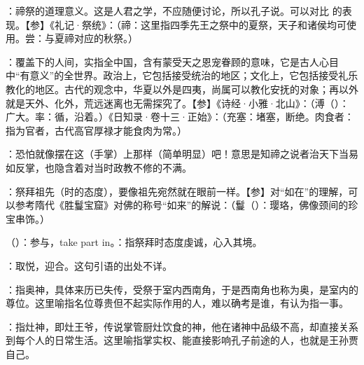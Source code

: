 {
\item {}：禘祭的道理意义。这是人君之学，不应随便讨论，所以孔子说。可以对比  的表现。【参】《礼记·祭统》：（禘：这里指四季先王之祭中的夏祭，天子和诸侯均可使用。尝：与夏禘对应的秋祭。）

\item {}：覆盖下的人间，实指全中国，含有蒙受天之恩宠眷顾的意味，它是古人心目中“有意义”的全世界。政治上，它包括接受统治的地区；文化上，它包括接受礼乐教化的地区。古代的观念中，华夏以外是四夷，尚属可以教化安抚的对象；再以外就是天外、化外，荒远迷离也无需探究了。【参】《诗经·小雅·北山》：（溥（）：广大。率：循，沿着。）《日知录·卷十三·正始》：（充塞：堵塞，断绝。肉食者：指为官者，古代高官厚禄才能食肉为常。）

\item {}：恐怕就像摆在这（手掌）上那样（简单明显）吧！意思是知禘之说者治天下当易如反掌，也隐含着对当时政教不修的不满。
}
{}


{
\item {}：祭拜祖先（时的态度），要像祖先宛然就在眼前一样。【参】对“如在”的理解，可以参考隋代《胜鬘宝窟》对佛的称号“如来”的解说：（鬘（）：璎珞，佛像颈间的珍宝串饰。）
\item {}（）：参与，take part in。：指祭拜时态度虔诚，心入其境。
}
{}  %


{
\item {}：取悦，迎合。这句引语的出处不详。
\item {}：指奥神，具体来历已失传，受祭于室内西南角，于是西南角也称为奥，是室内的尊位。这里喻指名位尊贵但不起实际作用的人，难以确考是谁，有认为指一事。%
\item {}：指灶神，即灶王爷，传说掌管厨灶饮食的神，他在诸神中品级不高，却直接关系到每个人的日常生活。这里喻指掌实权、能直接影响孔子前途的人，也就是王孙贾自己。
}
{}


